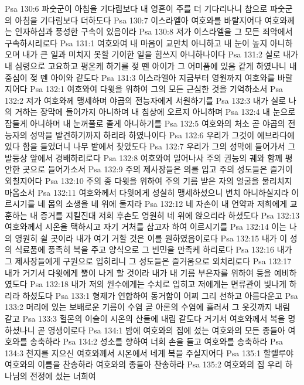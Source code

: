 Psa 130:6  파숫군이 아침을 기다림보다 내 영혼이 주를 더 기다리나니 참으로 파숫군의 아침을 기다림보다 더하도다
Psa 130:7  이스라엘아 여호와를 바랄지어다 여호와께는 인자하심과 풍성한 구속이 있음이라
Psa 130:8  저가 이스라엘을 그 모든 죄악에서 구속하시리로다
Psa 131:1  여호와여 내 마음이 교만치 아니하고 내 눈이 높지 아니하오며 내가 큰 일과 미치지 못할 기이한 일을 힘쓰지 아니하나이다
Psa 131:2  실로 내가 내 심령으로 고요하고 평온케 하기를 젖 뗀 아이가 그 어미품에 있음 같게 하였나니 내 중심이 젖 뗀 아이와 같도다
Psa 131:3  이스라엘아 지금부터 영원까지 여호와를 바랄지어다
Psa 132:1  여호와여 다윗을 위하여 그의 모든 근심한 것을 기억하소서
Psa 132:2  저가 여호와께 맹세하며 야곱의 전능자에게 서원하기를
Psa 132:3  내가 실로 나의 거하는 장막에 들어가지 아니하며 내 침상에 오르지 아니하며
Psa 132:4  내 눈으로 잠들게 아니하며 내 눈꺼풀로 졸게 아니하기를
Psa 132:5  여호와의 처소 곧 야곱의 전능자의 성막을 발견하기까지 하리라 하였나이다
Psa 132:6  우리가 그것이 에브라다에 있다 함을 들었더니 나무 밭에서 찾았도다
Psa 132:7  우리가 그의 성막에 들어가서 그 발등상 앞에서 경배하리로다
Psa 132:8  여호와여 일어나사 주의 권능의 궤와 함께 평안한 곳으로 들어가소서
Psa 132:9  주의 제사장들은 의를 입고 주의 성도들은 즐거이 외칠지어다
Psa 132:10  주의 종 다윗을 위하여 주의 기름 받은 자의 얼굴을 물리치지 마옵소서
Psa 132:11  여호와께서 다윗에게 성실히 맹세하셨으니 변치 아니하실지라 이르시기를 네 몸의 소생을 네 위에 둘지라
Psa 132:12  네 자손이 내 언약과 저희에게 교훈하는 내 증거를 지킬진대 저희 후손도 영원히 네 위에 앉으리라 하셨도다
Psa 132:13  여호와께서 시온을 택하시고 자기 거처를 삼고자 하여 이르시기를
Psa 132:14  이는 나의 영원히 쉴 곳이라 내가 여기 거할 것은 이를 원하였음이로다
Psa 132:15  내가 이 성의 식료품에 풍족히 복을 주고 양식으로 그 빈민을 만족케 하리로다
Psa 132:16  내가 그 제사장들에게 구원으로 입히리니 그 성도들은 즐거움으로 외치리로다
Psa 132:17  내가 거기서 다윗에게 뿔이 나게 할 것이라 내가 내 기름 부은자를 위하여 등을 예비하였도다
Psa 132:18  내가 저의 원수에게는 수치로 입히고 저에게는 면류관이 빛나게 하리라 하셨도다
Psa 133:1  형제가 연합하여 동거함이 어찌 그리 선하고 아름다운고
Psa 133:2  머리에 있는 보배로운 기름이 수염 곧 아론의 수염에 흘러서 그 옷깃까지 내림 같고
Psa 133:3  헐몬의 이슬이 시온의 산들에 내림 같도다 거기서 여호와께서 복을 명하셨나니 곧 영생이로다
Psa 134:1  밤에 여호와의 집에 섰는 여호와의 모든 종들아 여호와를 송축하라
Psa 134:2  성소를 향하여 너희 손을 들고 여호와를 송축하라
Psa 134:3  천지를 지으신 여호와께서 시온에서 네게 복을 주실지어다
Psa 135:1  할렐루야 여호와의 이름을 찬송하라 여호와의 종들아 찬송하라
Psa 135:2  여호와의 집 우리 하나님의 전정에 섰는 너희여
